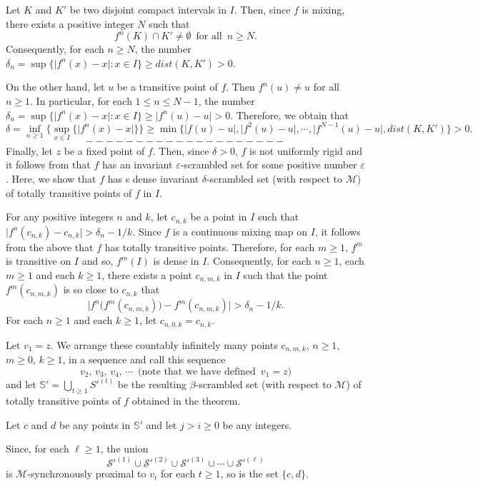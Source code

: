 \documentclass[12pt]{article}
\newcommand{\va}{\varepsilon}
\begin{document}
Let $K$ and $K'$ be two disjoint compact intervals in $I$.  Then, since $f$ is mixing, there exists a positive integer $N$ such that 
$$
f^n(K) \cap K' \ne \emptyset \,\,\, \text{for all} \,\,\, n \ge N.
$$
Consequently, for each $n \ge N$, the number $\delta_n = \sup \big\{ \big|f^n(x) - x\big|: x \in I \big\} \ge dist(K, K') > 0$.  

On the other hand, let $u$ be a transitive point of $f$.  Then $f^n(u) \ne u$ for all $n \ge 1$.  In particular, for each $1 \le n \le N-1$, the number $\delta_n = \sup \{ \big|f^n(x) - x\big|: x \in I \} \ge \big|f^n(u) - u\big| > 0$.  Therefore, we obtain that 
$$
\delta = \inf_{n \ge 1} \bigg\{ \sup_{x \in I} \big\{ \big|f^n(x) - x\big| \big\} \bigg\} \ge \min \big\{ \big|f(u) - u\big|, \big|f^2(u) - u\big|, \cdots, \big|f^{N-1}(u) - u\big|, dist(K, K') \big\} > 0.
$$
$$--------------------$$
\indent Finally, let $z$ be a fixed point of $f$.  Then, since $\delta > 0$, $f$ is not uniformly rigid and it follows from {\bf\cite{fo}} that $f$ has an invariant $\va$-scrambled set for some positive number $\va$.  Here, we show that $f$ has s dense invariant $\delta$-scrambled set (with respect to $\mathcal M$) of totally transitive points of $f$ in $I$.

For any positive integers $n$ and $k$, let $c_{n,k}$ be a point in $I$ such that $\big|f^n(c_{n,k}) - c_{n,k} \big| > \delta_n - 1/k$.  Since $f$ is a continuous mixing map on $I$, it follows from the above that $f$ has totally transitive points.  Therefore, for each $m \ge 1$, $f^m$ is transitive on $I$ and so, $f^m(I)$ is dense in $I$.  Consequently, for each $n \ge 1$, each $m \ge 1$ and each $k \ge 1$, there exists a point $c_{n,m,k}$ in $I$ such that the point $f^m(c_{n,m,k})$ is so close to $c_{n,k}$ that 
$$
\big|f^n\big(f^m(c_{n,m,k})\big) - f^m(c_{n,m,k})\big| > \delta_n - 1/k.
$$
For each $n \ge 1$ and each $k \ge 1$, let $c_{n,0,k} = c_{n,k}$.

Let $v_1 = z$. We arrange these countably infinitely many points $c_{n,m,k}, \, n \ge 1$, $m \ge 0$, $k \ge 1$, in a sequence and call this sequence 
$$
v_2, \, v_3, \, v_4, \, \cdots \,\,\, \text{(note that we have defined} \,\,\, v_1 = z)
$$
and let $\mathbb S' = \bigcup_{t \ge 1} S'^{(t)}$ be the resulting $\beta$-scrambled set (with respect to $\mathcal M$) of totally transitive points of $f$ obtained in the theorem.   

Let $c$ and $d$ be any points in $\mathbb S'$ and let $j > i \ge 0$ be any integers.  

Since, for each $\ell \ge 1$, the union 
$$
\mathcal S'^{(1)} \cup \mathcal S'^{(2)} \cup \mathcal S'^{(3)} \cup \cdots \cup \mathcal S'^{(\ell)}
$$
is $\mathcal M$-synchronously proximal to $v_t$ for each $t \ge 1$, so is the set $\{ c, d \}$.  
\end{document}
